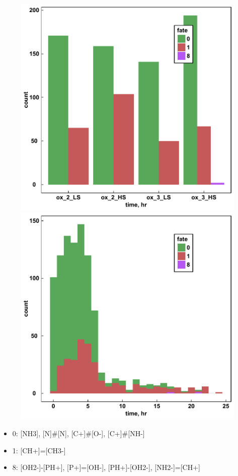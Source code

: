 \documentclass[xcolor=dvipsnames]{beamer}
\begin{document}
\begin{frame}
\begin{figure}[ht]
\begin{minipage}[b]{0.5\linewidth}
		\includegraphics[width=.6\linewidth]{img/fateBytype.pdf} 
	\end{minipage}%
	\begin{minipage}[b]{0.5\linewidth}
		\centering
		\includegraphics[width=.6\linewidth]{img/timeByfate.pdf} 
	\end{minipage} 
\end{figure}
\end{frame}


\begin{frame}
\begin{itemize}
\item 0: [NH3], [N]\#[N], [C+]\#[O-], [C+]\#[NH-]
\item 1: [CH+]=[CH3-]
\item 8: [OH2-]-[PH+], [P+]=[OH-], [PH+]-[OH2-], [NH2-]=[CH+]

\end{itemize}
\end{frame}
\end{document}
